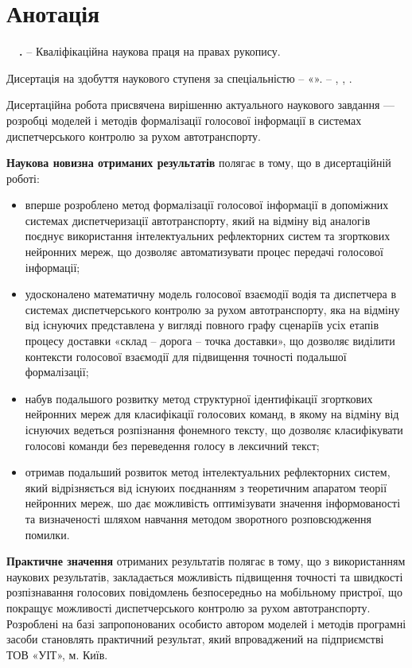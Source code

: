 \chapter*{Анотація}

\textbf{\thesisAuthorLastName~\thesisAuthorInitials\ \thesisTitle.} – Кваліфікаційна наукова праця на
правах рукопису.

Дисертація на здобуття наукового ступеня \thesisDegree за
спеціальністю \thesisSpecialtyNumber – «\thesisSpecialtyTitle». – \thesisOrganizationDone, \thesisCity, \thesisYear.

Дисертаційна робота присвячена вирішенню актуального наукового завдання --- розробці моделей і методів формалізації голосової інформації в системах диспетчерського контролю за рухом автотранспорту.

\textbf{Наукова новизна отриманих результатів} полягає в тому, що в дисертаційній роботі:

\begin{itemize}
	\item вперше розроблено метод формалізації голосової інформації в допоміжних системах диспетчеризації автотранспорту, який на відміну від аналогів поєднує використання інтелектуальних рефлекторних систем та згорткових нейронних мереж, що дозволяє автоматизувати процес передачі голосової інформації;
	\item удосконалено математичну модель голосової взаємодії водія та диспетчера в системах диспетчерського контролю за рухом автотранспорту, яка на відміну від існуючих представлена у вигляді повного графу сценаріїв усіх етапів процесу доставки «склад – дорога – точка доставки», що дозволяє виділити контексти голосової взаємодії для підвищення точності подальшої формалізації;
	\item набув подальшого розвитку метод структурної ідентифікації згорткових нейронних мереж для класифікації голосових команд, в якому на відміну від існуючих ведеться розпізнання фонемного тексту, що дозволяє класифікувати голосові команди без переведення голосу в лексичний текст;
	\item отримав подальший розвиток метод інтелектуальних рефлекторних систем, який відрізняється від існуюих поєднанням з теоретичним апаратом теорії нейронних мереж, шо дає можливість оптимізувати значення інформованості та визначеності шляхом навчання методом зворотного розповсюдження помилки.
\end{itemize}

\textbf{Практичне значення} отриманих результатів полягає в тому, що з використанням наукових результатів, закладається можливість підвищення точності та швидкості розпізнавання голосових повідомлень безпосередньо на мобільному пристрої, що покращує можливості диспетчерського контролю за рухом автотранспорту. Розроблені на базі запропонованих особисто автором моделей і методів програмні засоби становлять практичний результат, який впроваджений на підприємстві ТОВ «УІТ», м. Київ.

